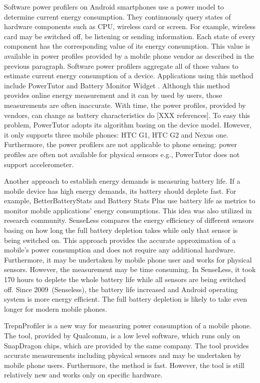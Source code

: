 Software power profilers on Android smartphones use a power model to determine current energy consumption. They continuously query states of hardware components such as CPU, wireless card or screen. For example, wireless card may be switched off, be listening or sending information. Each state of every component has the corresponding value of its energy consumption. This value is available in power profiles provided by a mobile phone vendor as described in the previous paragraph. Software power profilers aggregate all of those values to estimate current energy consumption of a device. Applications using this method include PowerTutor \cite{zhang:powertutor} and Battery Monitor Widget \cite{googleplay:batterymonitorwidget}. Although this method provides online energy measurement and it can by used by users, those measurements are often inaccurate. With time, the power profiles, provided by vendors, can change as battery characteristics do [XXX references]. To easy this problem, PowerTutor adopts its algorithm basing on the device model. However, it only supports three mobile phones: HTC G1, HTC G2 and Nexus one. Furthermore, the power profilers are not applicable to phone sensing: power profiles are often not available for physical sensors e.g., PowerTutor does not support accelerometer.

Another approach to establish energy demands is measuring battery life. If a mobile device has high energy demands, its battery should deplete fast. For example, BetterBatteryStats \cite{googleplay:betterbatterystats} and Battery Stats Plus \cite{googleplay:batterystatsplus} use battery life as metrics to monitor mobile applications' energy consumptions. This idea was also utilized in research community. SenseLess \cite{benabdesslem:senseless} compares the energy efficiency of different sensors basing on how long the full battery depletion takes while only that sensor is being switched on. This approach provides the accurate approximation of a mobile's power consumption and does not require any additional hardware. Furthermore, it may be undertaken by mobile phone user and works for physical sensors. However, the measurement may be time consuming. In SenseLess, it took 170 hours to deplete the whole battery life while all sensors are being switched off. Since 2009\ (Senseless), the battery life increased and Android operating system is more energy efficient. The full battery depletion is likely to take even longer for modern mobile phones.

TrepnProfiler \cite{qualcomm:trepnprofiler} is a new way for measuring power consumption of a mobile phone. The tool, provided by Qualcomm, is a low level software, which runs only on SnapDragon chips, which are provided by the same company. The tool provides accurate measurements including physical sensors and may be undertaken by mobile phone users. Furthermore, the method is fast. However, the tool is still relatively new and works only on specific hardware.
	
